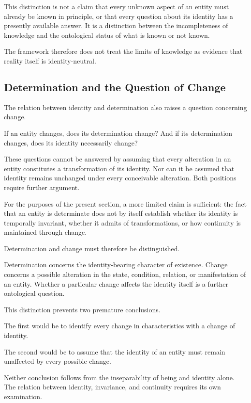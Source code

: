 This distinction is not a claim that every unknown aspect of an
entity must already be known in principle, or that every question
about its identity has a presently available answer. It is a
distinction between the incompleteness of knowledge and the
ontological status of what is known or not known.

The framework therefore does not treat the limits of knowledge
as evidence that reality itself is identity-neutral.

\subsection{Determination and the Question of Change}

The relation between identity and determination also raises a
question concerning change.

If an entity changes, does its determination change? And if its
determination changes, does its identity necessarily change?

These questions cannot be answered by assuming that every
alteration in an entity constitutes a transformation of its
identity. Nor can it be assumed that identity remains unchanged
under every conceivable alteration. Both positions require
further argument.

For the purposes of the present section, a more limited claim
is sufficient: the fact that an entity is determinate does not
by itself establish whether its identity is temporally invariant,
whether it admits of transformations, or how continuity is
maintained through change.

Determination and change must therefore be distinguished.

Determination concerns the identity-bearing character of
existence. Change concerns a possible alteration in the state,
condition, relation, or manifestation of an entity. Whether a
particular change affects the identity itself is a further
ontological question.

This distinction prevents two premature conclusions.

The first would be to identify every change in characteristics
with a change of identity.

The second would be to assume that the identity of an entity
must remain unaffected by every possible change.

Neither conclusion follows from the inseparability of being
and identity alone. The relation between identity, invariance,
and continuity requires its own examination.

